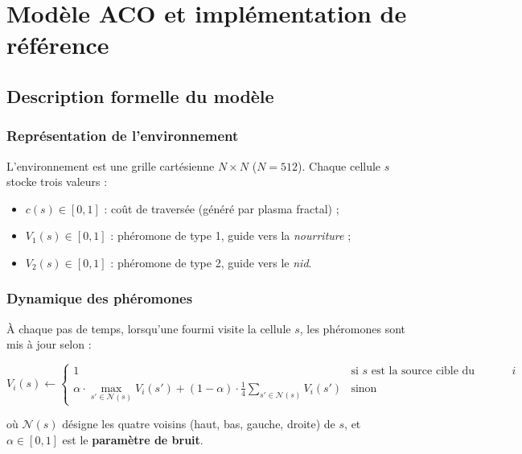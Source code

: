 \chapter{Modèle ACO et implémentation de référence}
\label{chap:modele}

\section{Description formelle du modèle}

\subsection{Représentation de l'environnement}

L'environnement est une grille cartésienne $N \times N$ ($N = 512$). Chaque cellule $s$
stocke trois valeurs :
\begin{itemize}
    \item $c(s) \in [0, 1]$ : coût de traversée (généré par plasma fractal) ;
    \item $V_1(s) \in [0, 1]$ : phéromone de type 1, guide vers la \emph{nourriture} ;
    \item $V_2(s) \in [0, 1]$ : phéromone de type 2, guide vers le \emph{nid}.
\end{itemize}

\subsection{Dynamique des phéromones}

À chaque pas de temps, lorsqu'une fourmi visite la cellule $s$, les phéromones sont mis à jour
selon :

\begin{equation}
    V_i(s) \leftarrow
    \begin{cases}
        1 & \text{si } s \text{ est la source cible du phéromone } i \\
        \alpha \cdot \max_{s' \in \mathcal{N}(s)} V_i(s')
        + (1 - \alpha) \cdot \frac{1}{4}\sum_{s' \in \mathcal{N}(s)} V_i(s')
        & \text{sinon}
    \end{cases}
    \label{eq:pheromone_update}
\end{equation}

où $\mathcal{N}(s)$ désigne les quatre voisins (haut, bas, gauche, droite) de $s$,
et $\alpha \in [0,1]$ est le \textbf{paramètre de bruit}.

